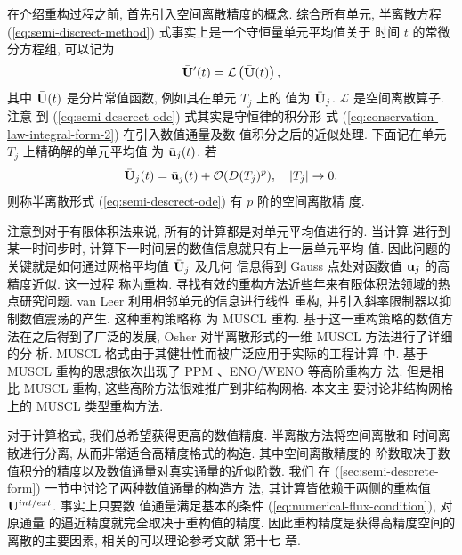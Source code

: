 在介绍重构过程之前, 首先引入空间离散精度的概念. 综合所有单元,
半离散方程 (\ref{eq:semi-discrect-method}) 式事实上是一个守恒量单元平均值关于
时间 $t$ 的常微分方程组, 可以记为
\begin{equation}
  \label{eq:semi-descrect-ode}
  \bar{{\bf{U}}}'(t) = \mathcal{L} \left( \bar{{\bf{U}}}(t) \right),
\end{equation}
其中 $\bar{{\bf{U}}}(t)$ 是分片常值函数, 例如其在单元 $T_{j}$ 上的
值为 $\bar{{\bf{U}}}_{j}$. $\mathcal{L}$ 是空间离散算子. 注意
到 (\ref{eq:semi-descrect-ode}) 式其实是守恒律的积分形
式 (\ref{eq:conservation-law-integral-form-2}) 在引入数值通量及数
值积分之后的近似处理. 下面记在单元 $T_{j}$ 上精确解的单元平均值
为 $\bar{\bf{u}}_{j}(t)$. 若
\begin{equation}
  \label{eq:spatial-accuracy}
  \bar{{\bf{U}}}_{j}(t) = \bar{{\bf{u}}}_{j}(t) +
  \mathcal{O}(D(T_{j})^{p}), \quad \vert T_{j} \vert \rightarrow 0.
\end{equation}
则称半离散形式 (\ref{eq:semi-descrect-ode}) 有 $p$ 阶的空间离散精
度.

注意到对于有限体积法来说, 所有的计算都是对单元平均值进行的. 当计算
进行到某一时间步时, 计算下一时间层的数值信息就只有上一层单元平均
值. 因此问题的关键就是如何通过网格平均值 $\bar{\bf{U}}_{j}$ 及几何
信息得到 Gauss 点处对函数值 ${\bf{u}}_{j}$ 的高精度近似. 这一过程
称为重构. 寻找有效的重构方法近些年来有限体积法领域的热点研究问题.
van Leer \cite{VANLEER1974361,Leer1979} 利用相邻单元的信息进行线性
重构, 并引入斜率限制器以抑制数值震荡的产生. 这种重构策略称
为 MUSCL 重构. 基于这一重构策略的数值方法在之后得到了广泛的发展,
Osher \cite{Osher1985} 对半离散形式的一维 MUSCL 方法进行了详细的分
析.  MUSCL 格式由于其健壮性而被广泛应用于实际的工程计算
中. 基于 MUSCL 重构的思想依次出现了 PPM
\cite{Colella1984}、ENO/WENO \cite{Shu1988,Liu1994} 等高阶重构方
法. 但是相比 MUSCL 重构, 这些高阶方法很难推广到非结构网格. 本文主
要讨论非结构网格上的 MUSCL 类型重构方法.

对于计算格式, 我们总希望获得更高的数值精度. 半离散方法将空间离散和
时间离散进行分离, 从而非常适合高精度格式的构造. 其中空间离散精度的
阶数取决于数值积分的精度以及数值通量对真实通量的近似阶数. 我们
在 (\ref{sec:semi-descrete-form}) 一节中讨论了两种数值通量的构造方
法, 其计算皆依赖于两侧的重构值 ${\bf{U}}^{int/ext}$. 事实上只要数
值通量满足基本的条件 (\ref{eq:numerical-flux-condition}), 对原通量
的逼近精度就完全取决于重构值的精度. 因此重构精度是获得高精度空间的
离散的主要因素, 相关的可以理论参考文献 \cite{LeVeque1992a} 第十七
章.

